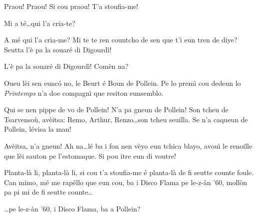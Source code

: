 \begin{drama}
\Taniaspeaks{} Praou! Praou! Si cou praou! T'a stoufia-me!

\Laurentspeaks{} Mi a té\ldots qui l'a cria-te?

\Taniaspeaks A mé qui l'a cria-me? Mi te te ren countcho de sen que t'i eun tren de diye? Seutta l'è pa la souaré di Digourdì!

\Laurentspeaks{} L'è pa la souaré di Digourdì! Comèn na?

\Taniaspeaks Oueu lèi sen eunc\'o no, le Beurt é Boun de Pollein. Pe lo premì cou dedeun lo \textit{Printemps} n'a doe compagnì que resiton eunsemblo.

\Laurentspeaks Qui se nen pippe de vo de Pollein! N'a pa gneun de Pollein! Son tcheu de Tsarvensoù, avèitsa: Remo, Arthur, Renzo\ldots son tcheu seuilla. Se n'a caqueun de Pollein, lévisa la man!


\Laurentspeaks Avèitsa, n'a gneun! Ah na\ldots lé ba i fon nen vèyo eun tchica blayo, avouì le renoille que lèi sauton pe l'estomaque. Si pou itre eun di voutre!

\Laurentspeaks Planta-là li, planta-là li, si cou t'a stoufia-me é planta-là de fi seutte counte foule. Can mimo, mé me rapéllo que eun cou, ba i Disco Flama pe le-z-àn '60, mollòn pa pi mi de fi seutte counte\ldots

\Laurentspeaks \ldots pe le-z-àn '60, i Disco Flama, ba a Pollein?


\act[Le-z-àn '60]

\ridoiver





\end{drama}
